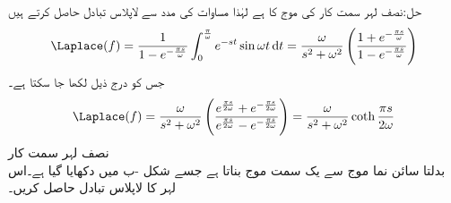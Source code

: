 حل:نصف لہر سمت کار کی موج کا  ہے لہٰذا مساوات  کی مدد سے لاپلاس تبادل حاصل کرتے ہیں
\begin{align}
\Laplace(f)=\frac{1}{1-e^{-\frac{\pi s}{\omega}}}\int_{0}^{\frac{\pi}{\omega}} e^{-st}\sin \omega t\dif t=\frac{\omega}{s^2+\omega^2} \left(\frac{1+e^{-\frac{\pi s}{\omega}}}{1-e^{-\frac{\pi s}{\omega}}}\right)
\end{align}
جس کو درج ذیل لکھا جا سکتا ہے۔
\begin{align*}
\Laplace(f)=\frac{\omega}{s^2+\omega^2} \left(\frac{e^{\frac{\pi s}{2\omega}}+e^{-\frac{\pi s}{2\omega}}}{e^{\frac{\pi s}{2\omega}}-e^{-\frac{\pi s}{2\omega}}}\right)=\frac{\omega}{s^2+\omega^2}\coth \frac{\pi s}{2\omega}
\end{align*}
\quad نصف لہر سمت کار\\
 بدلتا سائن نما موج سے یک سمت موج بناتا ہے جسے شکل -ب میں دکھایا گیا ہے۔اس لہر کا لاپلاس تبادل حاصل کریں۔


